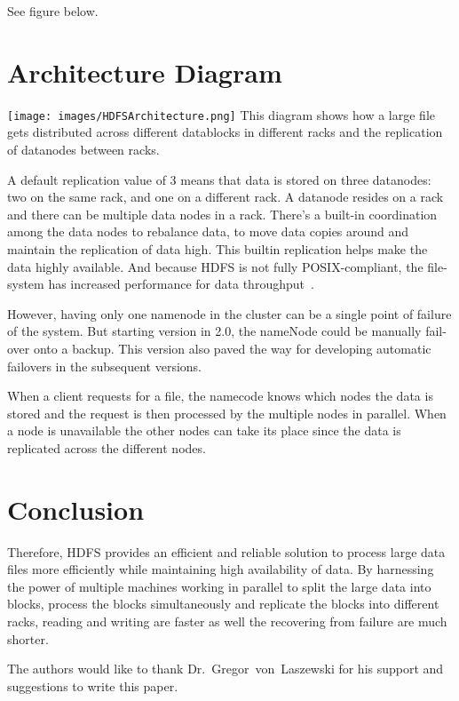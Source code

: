  See figure below.
 
\section{Architecture Diagram} 
\centering\texttt{[image: images/HDFSArchitecture.png]}
This diagram shows how a large file gets distributed across 
different datablocks in different racks and the replication of
datanodes between racks.
 
A default replication value of 3 means that data is stored on three
datanodes: two on the same rack, and one on a different rack. A
datanode resides on a rack and there can be multiple data nodes in a
rack. There’s a built-in coordination among the data nodes to
rebalance data, to move data copies around and maintain the
replication of data high. This builtin replication helps make the
data highly available. And because HDFS is not fully POSIX-compliant,
the file-system has increased performance for data throughput~\cite{hid-sp18-506-hdfs2}.

However, having only one namenode in the cluster can be a single
point of failure of the system. But starting version in 2.0, the
nameNode could be manually fail-over onto a backup. This version
also paved the way for developing automatic failovers in the
subsequent versions.

When a client requests for a file, the namecode knows which nodes the
data is stored and the request is then processed by the multiple
nodes in parallel. When a node is unavailable the other nodes can
take its place since the data is replicated across the different
nodes. 

\section {Conclusion}

Therefore, HDFS provides an efficient and reliable solution to
process large data files more efficiently while maintaining high
availability of data. By harnessing the  power of multiple machines
working in parallel to split the large data into blocks, process the
blocks simultaneously and replicate the blocks into different racks,
reading and writing are faster as well the recovering from failure
are much shorter.

\begin{acks}
  The authors would like to thank Dr.~Gregor~von~Laszewski for his
  support and suggestions to write this paper.
\end{acks}


 
